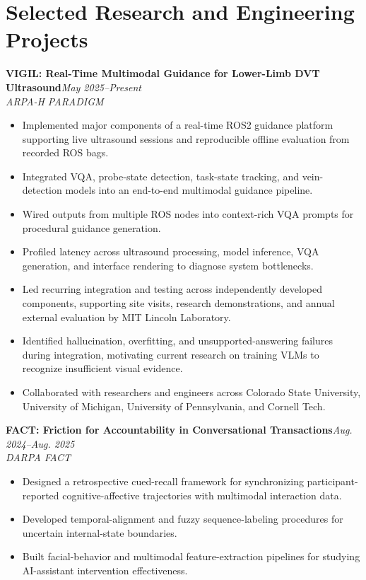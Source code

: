 \documentclass[9pt,letterpaper]{article}
\newcommand{\project}[3]{\textbf{#1}\hfill\textit{#3}\\\textit{#2}\vspace{-3pt}}
\begin{document}
\section{Selected Research and Engineering Projects}
\project{VIGIL: Real-Time Multimodal Guidance for Lower-Limb DVT Ultrasound}{ARPA-H PARADIGM}{May 2025--Present}
\begin{itemize}
\item Implemented major components of a real-time ROS2 guidance platform supporting live ultrasound sessions and reproducible offline evaluation from recorded ROS bags.
\item Integrated VQA, probe-state detection, task-state tracking, and vein-detection models into an end-to-end multimodal guidance pipeline.
\item Wired outputs from multiple ROS nodes into context-rich VQA prompts for procedural guidance generation.
\item Profiled latency across ultrasound processing, model inference, VQA generation, and interface rendering to diagnose system bottlenecks.
\item Led recurring integration and testing across independently developed components, supporting site visits, research demonstrations, and annual external evaluation by MIT Lincoln Laboratory.
\item Identified hallucination, overfitting, and unsupported-answering failures during integration, motivating current research on training VLMs to recognize insufficient visual evidence.
\item Collaborated with researchers and engineers across Colorado State University, University of Michigan, University of Pennsylvania, and Cornell Tech.
\end{itemize}

\project{FACT: Friction for Accountability in Conversational Transactions}{DARPA FACT}{Aug. 2024--Aug. 2025}
\begin{itemize}
\item Designed a retrospective cued-recall framework for synchronizing participant-reported cognitive-affective trajectories with multimodal interaction data.
\item Developed temporal-alignment and fuzzy sequence-labeling procedures for uncertain internal-state boundaries.
\item Built facial-behavior and multimodal feature-extraction pipelines for studying AI-assistant intervention effectiveness.
\end{itemize}
\end{document}
